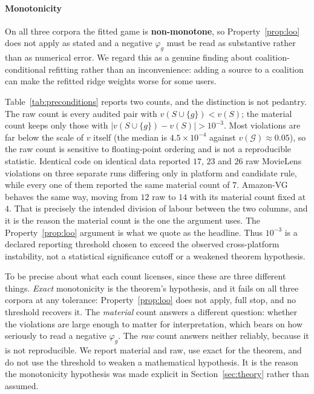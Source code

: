 \documentclass[pdflatex,sn-basic,Numbered]{sn-jnl}
\theoremstyle{plain}
\theoremstyle{definition}
\newcommand{\G}{\mathcal{G}}
\begin{document}
\paragraph{Monotonicity}
On all three corpora the fitted game is \textbf{non-monotone}, so
Property~\ref{prop:loo} does not apply as stated and a negative $\varphi_g$
must be read as substantive rather than as numerical error. We regard this as a
genuine finding about coalition-conditional refitting rather than an
inconvenience: adding a source to a coalition can make the refitted ridge
weights worse for some users.

Table~\ref{tab:preconditions} reports two counts, and the distinction is not
pedantry. The raw count is every audited pair with
$v(S \cup \{g\}) < v(S)$; the material count keeps only those with
$|v(S \cup \{g\}) - v(S)| > 10^{-3}$. Most violations are far below the scale of $v$ itself (the median is $4.5\times10^{-4}$ against $v(\G) \approx 0.05$), so the raw count is sensitive to floating-point ordering and is not a
reproducible statistic. Identical code on identical data reported $17$, $23$
and $26$ raw MovieLens violations on three separate runs differing only in
platform and candidate rule, while every one of them reported the same
material count of $7$. Amazon-VG behaves the same way, moving from $12$ raw
to $14$ with its material count fixed at $4$. That is precisely the intended
division of labour between the two columns, and it is the reason the material
count is the one the argument uses. The Property~\ref{prop:loo} argument
is what we quote as the headline. Thus $10^{-3}$ is a declared reporting
threshold chosen to exceed the observed cross-platform instability, not a
statistical significance cutoff or a weakened theorem hypothesis.

To be precise about what each count licenses, since these are three different
things. \emph{Exact} monotonicity is the theorem's hypothesis, and it fails on
all three corpora at any tolerance: Property~\ref{prop:loo} does not apply, full stop, and no threshold recovers it. The \emph{material} count answers a
different question: whether the violations are large enough to matter for
interpretation, which bears on how seriously to read a negative $\varphi_g$.
The \emph{raw} count answers neither reliably, because it is not reproducible.
We report material and raw, use exact for the theorem, and do not use the
threshold to weaken a mathematical hypothesis. It is the reason the
monotonicity hypothesis was made explicit in Section~\ref{sec:theory} rather
than assumed.
\end{document}
